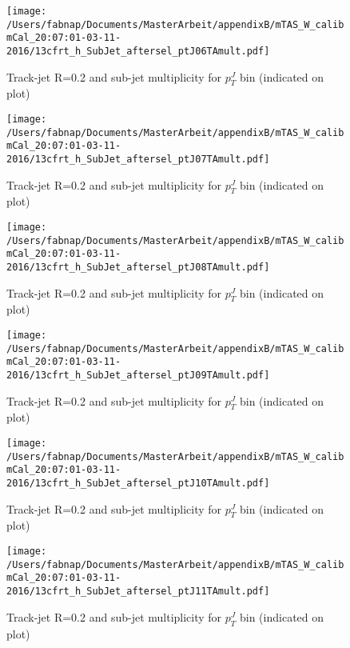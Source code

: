 \begin{figure}
 
\texttt{[image: /Users/fabnap/Documents/MasterArbeit/appendixB/mTAS\_W\_calibmCal\_20:07:01-03-11-2016/13cfrt\_h\_SubJet\_aftersel\_ptJ06TAmult.pdf]}
\caption{Track-jet R=0.2 and sub-jet multiplicity for $p_{T}^{J}$ bin (indicated on plot) }
 
\end{figure}
\begin{figure}
 
\texttt{[image: /Users/fabnap/Documents/MasterArbeit/appendixB/mTAS\_W\_calibmCal\_20:07:01-03-11-2016/13cfrt\_h\_SubJet\_aftersel\_ptJ07TAmult.pdf]}
\caption{Track-jet R=0.2 and sub-jet multiplicity for $p_{T}^{J}$ bin (indicated on plot) }
 
\end{figure}
 
\begin{figure}
 
\texttt{[image: /Users/fabnap/Documents/MasterArbeit/appendixB/mTAS\_W\_calibmCal\_20:07:01-03-11-2016/13cfrt\_h\_SubJet\_aftersel\_ptJ08TAmult.pdf]}
\caption{Track-jet R=0.2 and sub-jet multiplicity for $p_{T}^{J}$ bin (indicated on plot) }
 
\end{figure}

\begin{figure}

\texttt{[image: /Users/fabnap/Documents/MasterArbeit/appendixB/mTAS\_W\_calibmCal\_20:07:01-03-11-2016/13cfrt\_h\_SubJet\_aftersel\_ptJ09TAmult.pdf]}
\caption{Track-jet R=0.2 and sub-jet multiplicity for $p_{T}^{J}$ bin (indicated on plot) }
 
\end{figure}
 
\begin{figure}

\texttt{[image: /Users/fabnap/Documents/MasterArbeit/appendixB/mTAS\_W\_calibmCal\_20:07:01-03-11-2016/13cfrt\_h\_SubJet\_aftersel\_ptJ10TAmult.pdf]}
\caption{Track-jet R=0.2 and sub-jet multiplicity for $p_{T}^{J}$ bin (indicated on plot) }

\end{figure}

\begin{figure}

\texttt{[image: /Users/fabnap/Documents/MasterArbeit/appendixB/mTAS\_W\_calibmCal\_20:07:01-03-11-2016/13cfrt\_h\_SubJet\_aftersel\_ptJ11TAmult.pdf]}
\caption{Track-jet R=0.2 and sub-jet multiplicity for $p_{T}^{J}$ bin (indicated on plot) }

\end{figure}

